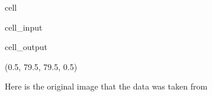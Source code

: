 \documentclass[letterpaper,10pt,english]{jupyterBook}
\begin{document}
\begin{sphinxuseclass}{cell}\begin{sphinxVerbatimInput}

\begin{sphinxuseclass}{cell_input}
\begin{sphinxVerbatim}[commandchars=\\\{\}]
  
\end{sphinxVerbatim}

\end{sphinxuseclass}\end{sphinxVerbatimInput}
\begin{sphinxVerbatimOutput}

\begin{sphinxuseclass}{cell_output}
\begin{sphinxVerbatim}[commandchars=\\\{\}]
(\PYGZhy{}0.5, 79.5, 79.5, \PYGZhy{}0.5)
\end{sphinxVerbatim}

\noindent{}

\end{sphinxuseclass}\end{sphinxVerbatimOutput}

\end{sphinxuseclass}
\sphinxAtStartPar
Here is the original image that the data was taken from
\end{document}

